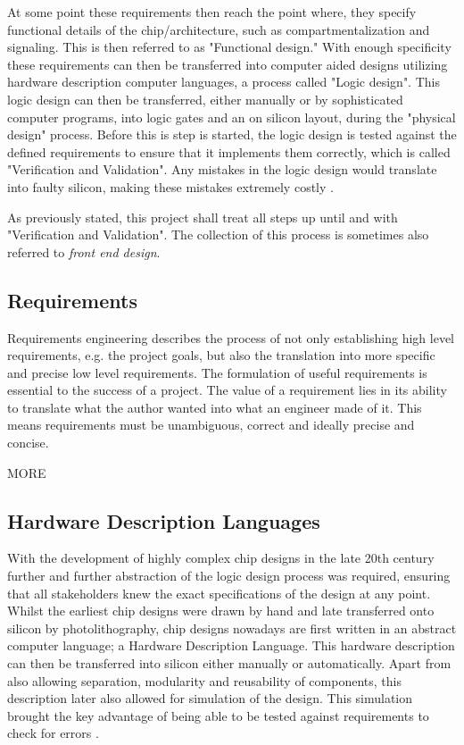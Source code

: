 At some point these requirements then reach the point where, they specify functional details of the chip/architecture, such as compartmentalization and signaling. This is then referred to as "Functional design." With enough specificity these requirements can then be transferred into computer aided designs utilizing hardware description computer languages, a process called "Logic design". This logic design can then be transferred, either manually or by sophisticated computer programs, into logic gates and an on silicon layout, during the "physical design"  process. Before this is step is started, the logic design is tested against the defined requirements to ensure that it implements them correctly, which is called "Verification and Validation". Any mistakes in the logic design would translate into faulty silicon, making these mistakes extremely costly \cite{chipdesignflow1} \cite{chipdesignflow2}.

As previously stated, this project shall treat all steps up until and with "Verification and Validation". The collection of this process is sometimes also referred to \textit{front end design}.

\subsection{Requirements}
Requirements engineering describes the process of not only establishing high level requirements, e.g. the project goals, but also the translation into more specific and precise low level requirements. The formulation of useful requirements is essential to the success of a project. The value of a requirement lies in its ability to translate what the author wanted into what an engineer made of it. This means requirements must be unambiguous, correct and ideally precise and concise. \cite{cite.needed}

MORE

\subsection{Hardware Description Languages}
With the development of highly complex chip designs in the late 20th century further and further abstraction of the logic design process was required, ensuring that all stakeholders knew the exact specifications of the design at any point. Whilst the earliest chip designs were drawn by hand and late transferred onto silicon by photolithography, chip designs nowadays are first written in an abstract computer language; a Hardware Description Language. This hardware description can then be transferred into silicon either manually or automatically.  Apart from also allowing separation, modularity and reusability of components, this description later also allowed for simulation of the design. This simulation brought the key advantage of being able to be tested against requirements to check for errors \cite{histverilog} \cite{1214355}.

